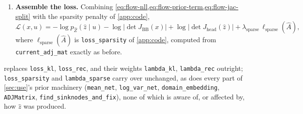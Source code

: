 \begin{enumerate}[label=(\arabic*),leftmargin=2em]
\item \textbf{Assemble the loss.} Combining \cref{eq:flow-nll,eq:flow-prior-term,eq:flow-jac-split} with
      the sparsity penalty of \cref{app:code},
      \begin{equation}
      \mathcal L(x,u) = -\log p_{\hat Z}(\hat z\mid u) - \log\bigl|\det J_{\mathrm{BB}}(x)\bigr|
      + \log\bigl|\det J_{\mathrm{head}}(\hat z)\bigr| + \lambda_{\mathrm{sparse}}\,\ell_{\mathrm{sparse}}(\hat A),
      \label{eq:flow-loss}
      \end{equation}
      where $\ell_{\mathrm{sparse}}(\hat A)$ is \texttt{loss\_sparsity} of \cref{app:code}, computed from
      \texttt{current\_adj\_mat} exactly as before.
\end{enumerate}
 replaces \texttt{loss\_kl}, \texttt{loss\_rec}, and their weights
\texttt{lambda\_kl}, \texttt{lambda\_rec} outright; \texttt{loss\_sparsity} and \texttt{lambda\_sparse}
carry over unchanged, as does every part of \cref{sec:use}'s prior machinery
(\texttt{mean\_net}, \texttt{log\_var\_net}, \texttt{domain\_embedding}, \texttt{ADJMatrix},
\texttt{find\_sinknodes\_and\_fix}), none of which is aware of, or affected by, how $\hat z$ was produced.

